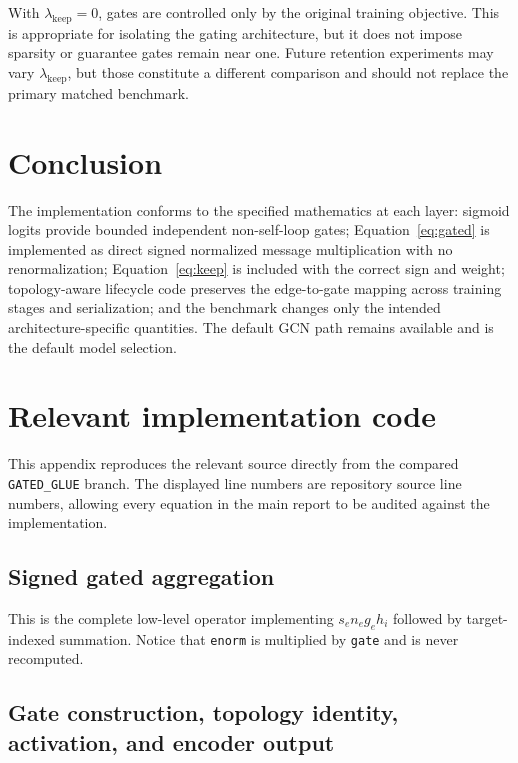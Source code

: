 \documentclass[11pt]{article}
\newcommand{\code}[1]{\texttt{#1}}
\begin{document}
With $\lambda_{\mathrm{keep}}=0$, gates are controlled only by the original
training objective.  This is appropriate for isolating the gating architecture,
but it does not impose sparsity or guarantee gates remain near one.  Future
retention experiments may vary $\lambda_{\mathrm{keep}}$, but those constitute
a different comparison and should not replace the primary matched benchmark.

\section{Conclusion}

The implementation conforms to the specified mathematics at each layer:
sigmoid logits provide bounded independent non-self-loop gates;
Equation~\eqref{eq:gated} is implemented as direct signed normalized message
multiplication with no renormalization; Equation~\eqref{eq:keep} is included
with the correct sign and weight; topology-aware lifecycle code preserves the
edge-to-gate mapping across training stages and serialization; and the benchmark
changes only the intended architecture-specific quantities.  The default GCN
path remains available and is the default model selection.

\appendix
\section{Relevant implementation code}

This appendix reproduces the relevant source directly from the compared
\code{GATED\_GLUE} branch.  The displayed line numbers are repository source
line numbers, allowing every equation in the main report to be audited against
the implementation.

\subsection{Signed gated aggregation}

This is the complete low-level operator implementing
$s_e n_e g_e h_i$ followed by target-indexed summation.  Notice that
\code{enorm} is multiplied by \code{gate} and is never recomputed.



\subsection{Gate construction, topology identity, activation, and encoder output}
\end{document}
